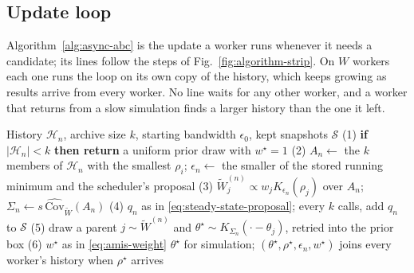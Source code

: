 \documentclass[10pt]{article}
\theoremstyle{plain}
\theoremstyle{definition}
\begin{document}
\subsection{Update loop}\label{sec:method-algorithm}
Algorithm~\ref{alg:async-abc} is the update a worker runs whenever it needs a candidate; its lines follow the steps of Fig.~\ref{fig:algorithm-strip}. On $W$ workers each one runs the loop on its own copy of the history, which keeps growing as results arrive from every worker. No line waits for any other worker, and a worker that returns from a slow simulation finds a larger history than the one it left.
\begin{algorithm}
\caption{One update of the generation-free sampler, run by a worker on its copy of the history}\label{alg:async-abc}
\begin{algorithmic}
\Require History $\mathcal{H}_n$, archive size $k$, starting bandwidth $\epsilon_0$, kept snapshots $\mathcal{S}$
\State (1) \textbf{if} $|\mathcal{H}_n|<k$ \textbf{then return} a uniform prior draw with $w^\star=1$ 
\State (2) $A_n\gets$ the $k$ members of $\mathcal{H}_n$ with the smallest $\rho_i$; $\epsilon_n\gets$ the smaller of the stored running minimum and the scheduler's proposal
\State (3) $\tilde W^{(n)}_j\propto w_jK_{\epsilon_n}(\rho_j)$ over $A_n$; $\Sigma_n\gets s\,\widehat{\mathrm{Cov}}_{\tilde W}(A_n)$
\State (4) $q_n$ as in \eqref{eq:steady-state-proposal}; every $k$ calls, add $q_n$ to $\mathcal{S}$
\State (5) draw a parent $j\sim\tilde W^{(n)}$ and $\theta^\star\sim K_{\Sigma_n}(\cdot-\theta_j)$, retried into the prior box
\State (6) $w^\star$ as in \eqref{eq:amis-weight}
\State \Return $\theta^\star$ for simulation; $(\theta^\star,\rho^\star,\epsilon_n,w^\star)$ joins every worker's history when $\rho^\star$ arrives
\end{algorithmic}
\end{algorithm}
\end{document}
